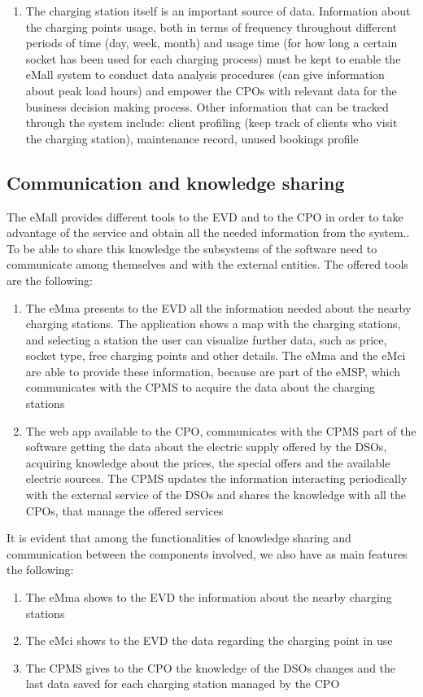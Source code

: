 \begin{enumerate}
    \item The charging station itself is an important source of data. Information about the charging points usage, both in terms of frequency throughout different periods of time (day, week, month) and usage time (for how long a certain socket has been used for each charging process) must be kept to enable the eMall system to conduct data analysis procedures (can give information about peak load hours) and empower the CPOs with relevant data for the business decision making process. Other information that can be tracked through the system include: client profiling (keep track of clients who visit the charging station), maintenance record, unused bookings profile
\end{enumerate}

\subsection{Communication and knowledge sharing}
The eMall provides different tools to the EVD and to the CPO in order to take advantage of the service and obtain all the needed information from the system.. To be able to share this knowledge the subsystems of the software need to communicate among themselves and with the external entities. The offered tools are the following:
\begin{enumerate}
    \item The eMma presents to the EVD all the information needed about the nearby charging stations. The application shows a map with the charging stations, and selecting a station the user can visualize further data, such as price, socket type, free charging points and other details. The eMma and the eMci are able to provide these information, because are part of the eMSP, which communicates with the CPMS to acquire the data about the charging stations 
    \item The web app available to the CPO, communicates with the CPMS part of the software getting the data about the electric supply offered by the DSOs, acquiring knowledge about the prices, the special offers and the available electric sources. The CPMS updates the information interacting periodically with the external service of the DSOs and shares the knowledge with all the CPOs, that manage the offered services
\end{enumerate}
It is evident that among the functionalities of knowledge sharing and communication between the components involved, we also have as main features the following:
\begin{enumerate}
    \item The eMma shows to the EVD the information about the nearby charging stations
    \item The eMci shows to the EVD the data regarding the charging point in use
    \item The CPMS gives to the CPO the knowledge of the DSOs changes and the last data saved for each charging station managed by the CPO
\end{enumerate}

